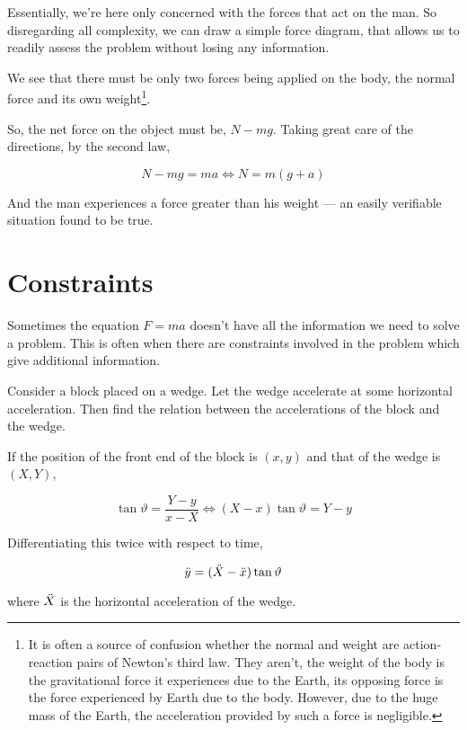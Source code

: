 Essentially, we're here only concerned with the forces that act on the man. So disregarding
all complexity, we can draw a simple force diagram, that allows us to readily assess 
the problem without losing any information.


We see that there must be only two forces being applied on the body,
the normal force and its own weight\footnote{It is often a source of 
confusion whether the normal and weight are action-reaction pairs of Newton's third law.
They aren't, the weight of the body is the gravitational force it experiences 
due to the Earth, its opposing force is the force experienced by Earth due to the body.
However, due to the huge mass of the Earth, the acceleration provided by such a force is 
negligible.}.

So, the net force on the object must be, \(N - mg\). Taking great care of the directions, 
by the second law,

\begin{equation*}
    N - mg = ma \iff N = m(g + a)
\end{equation*}

And the man experiences a force greater than his weight --- an easily verifiable situation found 
to be true.

\section{Constraints}

Sometimes the equation \(F = ma\) doesn't have all the information we need to solve a 
problem. This is often when there are constraints involved in the problem which give 
additional information.

\begin{marginfigure}
\end{marginfigure}

\begin{example}
Consider a block placed on a wedge. Let the wedge accelerate 
at some horizontal acceleration. Then find the relation between the accelerations 
of the block and the wedge.

\begin{soln}
    If the position of the front end of the block is 
    \((x,y)\) and that of the wedge is \((X, Y)\), 

    \begin{equation*}
        \tan\vartheta = \frac{Y-y}{x - X} \iff (X - x)\tan\vartheta = Y - y
    \end{equation*}

    Differentiating this twice with respect to time, 

    \begin{equation}
        \ddot{y} = (\ddot{X} - \ddot{x}) \tan\vartheta
    \end{equation}

    where \(\ddot{X}\) is the horizontal acceleration of the wedge.
\end{soln}
\end{example}


